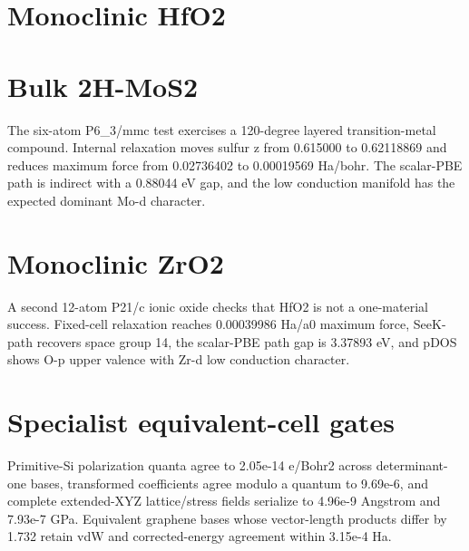 \documentclass[10pt,a4paper]{report}
\begin{document}
\section{Monoclinic HfO2}
\begin{center}\end{center}
\section{Bulk 2H-MoS2}
The six-atom P6\_3/mmc test exercises a 120-degree layered transition-metal compound. Internal relaxation moves sulfur z from 0.615000 to 0.62118869 and reduces maximum force from 0.02736402 to 0.00019569 Ha/bohr. The scalar-PBE path is indirect with a 0.88044 eV gap, and the low conduction manifold has the expected dominant Mo-d character.

\section{Monoclinic ZrO2}
A second 12-atom P21/c ionic oxide checks that HfO2 is not a one-material success. Fixed-cell relaxation reaches 0.00039986 Ha/a0 maximum force, SeeK-path recovers space group 14, the scalar-PBE path gap is 3.37893 eV, and pDOS shows O-p upper valence with Zr-d low conduction character.

\section{Specialist equivalent-cell gates}
Primitive-Si polarization quanta agree to 2.05e-14 e/Bohr2 across determinant-one bases, transformed coefficients agree modulo a quantum to 9.69e-6, and complete extended-XYZ lattice/stress fields serialize to 4.96e-9 Angstrom and 7.93e-7 GPa. Equivalent graphene bases whose vector-length products differ by 1.732 retain vdW and corrected-energy agreement within 3.15e-4 Ha.
\end{document}
